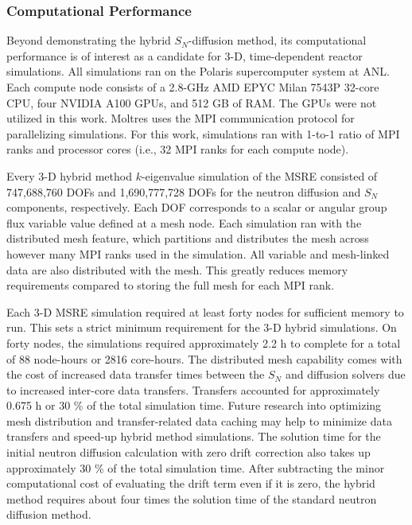 \subsubsection{Computational Performance}

Beyond demonstrating the hybrid $S_N$-diffusion method, its computational performance is of
interest as a candidate for 3-D, time-dependent reactor simulations. All simulations ran on the
Polaris supercomputer system at \gls{ANL}. Each compute node consists of a 2.8-GHz AMD EPYC Milan
7543P 32-core CPU, four NVIDIA A100 GPUs, and 512 GB of RAM. The GPUs were not utilized in this
work. Moltres uses the \gls{MPI} communication protocol for parallelizing simulations. For this
work, simulations ran with 1-to-1 ratio of \gls{MPI} ranks and processor cores (i.e., 32 \gls{MPI}
ranks for each compute node).

Every 3-D hybrid method $k$-eigenvalue
simulation of the \gls{MSRE} consisted of 747,688,760 \glspl{DOF} and 1,690,777,728 \glspl{DOF} for
the neutron diffusion and $S_N$ components, respectively. Each \gls{DOF} corresponds to a scalar
or angular group flux variable value defined at a mesh node. Each simulation ran with the distributed
mesh feature, which partitions and distributes the mesh across however many \gls{MPI} ranks used
in the simulation. All variable and mesh-linked data are also distributed with the mesh. This
greatly reduces memory requirements compared to storing the full mesh for each \gls{MPI} rank.

Each 3-D \gls{MSRE} simulation required at least forty nodes for sufficient memory to run. This
sets a strict minimum requirement for the 3-D hybrid simulations. On forty nodes, the simulations
required approximately 2.2 h to complete for a total of 88 node-hours or 2816 core-hours. The
distributed mesh capability comes with the cost of increased data transfer times between the $S_N$
and diffusion solvers due to increased inter-core data transfers. Transfers accounted for
approximately 0.675 h or 30 \% of the total simulation time. Future research into optimizing mesh
distribution and transfer-related data caching may help to minimize data transfers and speed-up
hybrid method simulations. The solution time for the initial neutron diffusion calculation with zero
drift correction also takes up approximately 30 \% of the total simulation time. After subtracting
the minor computational cost of evaluating the drift term even if it is zero, the hybrid method
requires about four times the solution time of the standard neutron diffusion method.

